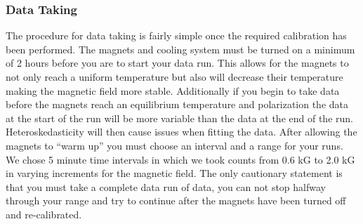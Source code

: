 \subsubsection{Data Taking}

The procedure for data taking is fairly simple once the required calibration has been performed.  The magnets and cooling system must be turned on a minimum of 2 hours before you are to start your data run.  This allows for the magnets to not only reach a uniform temperature but also will decrease their temperature making the magnetic field more stable. Additionally if you begin to take data before the magnets reach an equilibrium temperature and polarization the data at the start of the run will be more variable than the data at the end of the run. Heteroskedasticity will then cause issues when fitting the data. After allowing the magnets to ``warm up'' you must choose an interval and a range for your runs.  We chose 5 minute time intervals in which we took counts from 0.6 kG to 2.0 kG in varying increments for the magnetic field.  The only cautionary statement is that you must take a complete data run of data, you can not stop halfway through your range and try to continue after the magnets have been turned off and re-calibrated. 

